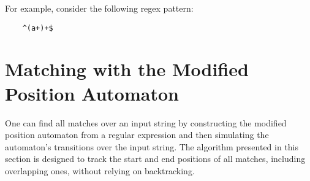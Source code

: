 

For example, consider the following regex pattern:
\begin{verbatim}
	^(a+)+$
\end{verbatim}

\section {Matching with the Modified Position Automaton}
One can find all matches over an input string by constructing the modified position automaton from a regular expression and then simulating the automaton's transitions over the input string. The algorithm presented in this section is designed to track the start and end positions of all matches, including overlapping ones, without relying on backtracking.

